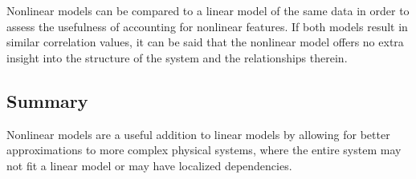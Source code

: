 Nonlinear models can be compared to a linear model of the same data in order to assess the usefulness of accounting for nonlinear features. If both models result in similar correlation values, it can be said that the nonlinear model offers no extra insight into the structure of the system and the relationships therein. 

\subsection{Summary}
Nonlinear models are a useful addition to linear models by allowing for better approximations to more complex physical systems, where the entire system may not fit a linear model or may have localized dependencies. 



